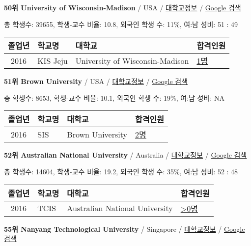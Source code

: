 \documentclass[13pt,]{article}
\begin{document}
\textbf{50위 University of Wisconsin-Madison} / USA /
\href{https://www.timeshighereducation.com/world-university-rankings/university-of-wisconsin-madison?ranking-dataset=133819}{대학교정보}
/
\href{http://www.google.com/search?q=University+of+Wisconsin-Madison}{Google
검색}

총 학생수: 39655, 학생-교수 비율: 10.8, 외국인 학생 수: 11\%, 여:남
성비: 51 : 49

\begin{longtable}[]{@{}clll@{}}
\toprule
졸업년 & 학교명 & 대학교 & 합격인원\tabularnewline
\midrule
\endhead
2016 & KIS Jeju & University of Wisconsin-Madison &
\href{http://cafe.naver.com/assarabia/11596}{1명}\tabularnewline
\bottomrule
\end{longtable}

\textbf{51위 Brown University} / USA /
\href{https://www.timeshighereducation.com/world-university-rankings/brown-university?ranking-dataset=133819}{대학교정보}
/ \href{http://www.google.com/search?q=Brown+University}{Google 검색}

총 학생수: 8653, 학생-교수 비율: 10.1, 외국인 학생 수: 19\%, 여:남 성비:
NA

\begin{longtable}[]{@{}clll@{}}
\toprule
졸업년 & 학교명 & 대학교 & 합격인원\tabularnewline
\midrule
\endhead
2016 & SIS & Brown University &
\href{http://cafe.naver.com/assarabia/11589}{2명}\tabularnewline
\bottomrule
\end{longtable}

\textbf{52위 Australian National University} / Australia /
\href{https://www.timeshighereducation.com/world-university-rankings/australian-national-university?ranking-dataset=133819}{대학교정보}
/
\href{http://www.google.com/search?q=Australian+National+University}{Google
검색}

총 학생수: 14604, 학생-교수 비율: 19.2, 외국인 학생 수: 35\%, 여:남
성비: 52 : 48

\begin{longtable}[]{@{}clll@{}}
\toprule
졸업년 & 학교명 & 대학교 & 합격인원\tabularnewline
\midrule
\endhead
2016 & TCIS & Australian National University &
\href{http://cafe.naver.com/assarabia/11598}{\textgreater{}0명}\tabularnewline
\bottomrule
\end{longtable}

\textbf{55위 Nanyang Technological University} / Singapore /
\href{https://www.timeshighereducation.com/world-university-rankings/nanyang-technological-university?ranking-dataset=133819}{대학교정보}
/
\href{http://www.google.com/search?q=Nanyang+Technological+University}{Google
검색}
\end{document}
